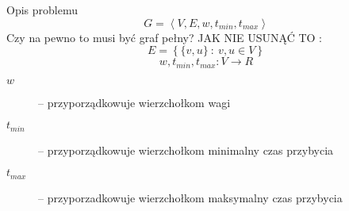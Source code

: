 \begin{block}{Opis problemu}
	\begin{equation}
		G = \left< V, E, w, t_{min}, t_{max} \right>
	\end{equation}
	Czy na pewno to musi być graf pełny? JAK NIE USUNĄĆ TO :
	\begin{equation}
		E = \left\{ \{v, u\} \ : \ v, u \in V \right\}
	\end{equation}
	\begin{equation}
		w, t_{min}, t_{max} : V \rightarrow R
	\end{equation}
	\begin{description}
		\item[$w$] -- przyporządkowuje wierzchołkom wagi
		\item[$t_{min}$] -- przyporządkowuje wierzchołkom minimalny czas przybycia
		\item[$t_{max}$] -- przyporzadkowuje wierzchołkom maksymalny czas przybycia
	\end{description}
\end{block}
